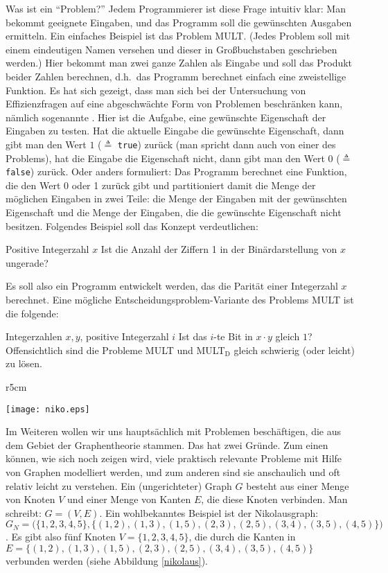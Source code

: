 Was ist ein "`Problem?"' Jedem Programmierer ist diese Frage intuitiv
klar: Man bekommt geeignete Eingaben, und das Programm soll die
gewünschten Ausgaben ermitteln. Ein einfaches Beispiel ist das Problem
MULT. (Jedes Problem soll mit einem eindeutigen Namen versehen und
dieser in Großbuchstaben geschrieben werden.) Hier bekommt man zwei
ganze Zahlen als Eingabe und soll das Produkt beider Zahlen berechnen,
d.h.~das Programm berechnet einfach eine zweistellige Funktion. Es hat
sich gezeigt, dass man sich bei der Untersuchung von Effizienzfragen
auf eine abgeschwächte Form von Problemen beschränken kann, nämlich
sogenannte . Hier ist die Aufgabe, eine
gewünschte Eigenschaft der Eingaben zu testen. Hat die aktuelle
Eingabe die gewünschte Eigenschaft, dann gibt man den Wert $1$
($\triangleq$ \texttt{true}) zurück
(man spricht dann auch von einer 
 des Problems), hat 
die Eingabe die Eigenschaft nicht, dann gibt man den Wert $0$
($\triangleq$ \texttt{false}) zurück. Oder anders formuliert: Das
Programm berechnet eine Funktion, die den Wert 0 oder 1 zurück gibt
und partitioniert damit die Menge der möglichen Eingaben in zwei
Teile: die Menge der Eingaben mit der gewünschten Eigenschaft und die
Menge der Eingaben, die die gewünschte Eigenschaft nicht
besitzen. Folgendes Beispiel soll das Konzept verdeutlichen:

{Positive Integerzahl $x$}
{Ist die Anzahl der Ziffern 1 in der Binärdarstellung von $x$ ungerade?}

Es soll also ein Programm entwickelt werden, das die Parität einer
Integerzahl $x$ berechnet. Eine mögliche Entscheidungsproblem-Variante
des Problems MULT ist die folgende:

\goodbreak
{}
{Integerzahlen $x,y$, positive Integerzahl $i$}
{Ist das $i$-te Bit in $x\cdot y$ gleich $1$?}
Offensichtlich sind die Probleme MULT und MULT$_\mathrm{D}$ gleich schwierig (oder
leicht) zu lösen.

\begin{wrapfigure}[14]{r}{5cm}
\centerline{\texttt{[image: niko.eps]}}
\caption{Der Graph $G_N$}
\label{nikolaus} 
\end{wrapfigure}
Im Weiteren wollen wir uns hauptsächlich mit Problemen beschäftigen,
die aus dem Gebiet der Graphentheorie stammen.  Das hat zwei
Gründe. Zum einen können, wie sich noch zeigen wird, viele praktisch
relevante Probleme mit Hilfe von Graphen modelliert werden, und zum
anderen sind sie anschaulich und oft relativ leicht zu verstehen.  Ein
(ungerichteter) Graph $G$ besteht aus einer Menge von Knoten $V$ und
einer Menge von Kanten $E$, die diese Knoten verbinden. Man schreibt:
$G=(V,E)$. Ein wohlbekanntes Beispiel ist der Nikolausgraph:
$G_N=\bigl(\{1,2,3,4,5\},\allowbreak\{(1,2),\allowbreak(1,3),\allowbreak
(1,5),\allowbreak(2,3),\allowbreak(2,5),\allowbreak(3,4),\allowbreak
(3,5),\allowbreak(4,5)\}\bigr)$.  Es gibt also fünf Knoten
$V=\{1,2,3,4,5\}$, die durch die Kanten in
$E=\{(1,2),\allowbreak(1,3),\allowbreak(1,5),\allowbreak(2,3),\allowbreak
(2,5),\allowbreak(3,4),\allowbreak(3,5),\allowbreak(4,5)\}$ verbunden
werden (siehe Abbildung \ref{nikolaus}).


